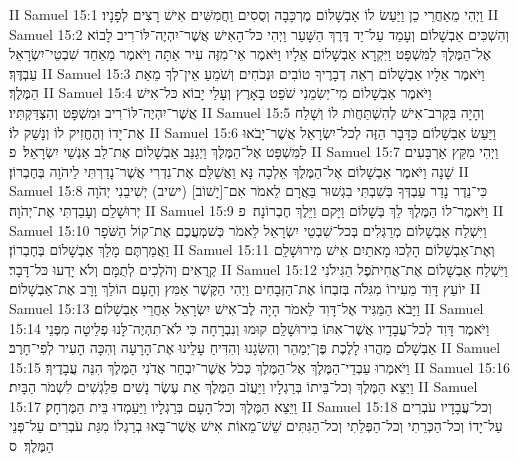II Samuel 15:1	וַיְהִי מֵאַחֲרֵי כֵן וַיַּעַשׂ לוֹ אַבְשָׁלוֹם מֶרְכָּבָה וְסֻסִים וַחֲמִשִּׁים אִישׁ רָצִים לְפָנָיו׃
II Samuel 15:2	וְהִשְׁכִּים אַבְשָׁלוֹם וְעָמַד עַל־יַד דֶּרֶךְ הַשָּׁעַר וַיְהִי כּל־הָאִישׁ אֲשֶׁר־יִהְיֶה־לּוֹ־רִיב לָבוֹא אֶל־הַמֶּלֶךְ לַמִּשְׁפָּט וַיִּקְרָא אַבְשָׁלוֹם אֵלָיו וַיֹּאמֶר אֵי־מִזֶּה עִיר אַתָּה וַיֹּאמֶר מֵאַחַד שִׁבְטֵי־יִשְׂרָאֵל עַבְדֶּךָ׃
II Samuel 15:3	וַיֹּאמֶר אֵלָיו אַבְשָׁלוֹם רְאֵה דְבָרֶיךָ טוֹבִים וּנְכֹחִים וְשֹׁמֵעַ אֵין־לְךָ מֵאֵת הַמֶּלֶךְ׃
II Samuel 15:4	וַיֹּאמֶר אַבְשָׁלוֹם מִי־יְשִׂמֵנִי שֹׁפֵט בָּאָרֶץ וְעָלַי יָבוֹא כּל־אִישׁ אֲשֶׁר־יִהְיֶה־לּוֹ־רִיב וּמִשְׁפָּט וְהִצְדַּקְתִּיו׃
II Samuel 15:5	וְהָיָה בִּקְרב־אִישׁ לְהִשְׁתַּחֲוֺת לוֹ וְשָׁלַח אֶת־יָדוֹ וְהֶחֱזִיק לוֹ וְנָשַׁק לוֹ׃
II Samuel 15:6	וַיַּעַשׂ אַבְשָׁלוֹם כַּדָּבָר הַזֶּה לְכל־יִשְׂרָאֵל אֲשֶׁר־יָבֹאוּ לַמִּשְׁפָּט אֶל־הַמֶּלֶךְ וַיְגַנֵּב אַבְשָׁלוֹם אֶת־לֵב אַנְשֵׁי יִשְׂרָאֵל׃ {פ}
II Samuel 15:7	וַיְהִי מִקֵּץ אַרְבָּעִים שָׁנָה וַיֹּאמֶר אַבְשָׁלוֹם אֶל־הַמֶּלֶךְ אֵלְכָה נָּא וַאֲשַׁלֵּם אֶת־נִדְרִי אֲשֶׁר־נָדַרְתִּי לַיהֹוָה בְּחֶבְרוֹן׃
II Samuel 15:8	כִּי־נֵדֶר נָדַר עַבְדְּךָ בְּשִׁבְתִּי בִגְשׁוּר בַּאֲרָם לֵאמֹר אִם־[יָשׁוֹב] (ישיב) יְשִׁיבֵנִי יְהֹוָה יְרוּשָׁלַ͏ִם וְעָבַדְתִּי אֶת־יְהֹוָה׃
II Samuel 15:9	וַיֹּאמֶר־לוֹ הַמֶּלֶךְ לֵךְ בְּשָׁלוֹם וַיָּקם וַיֵּלֶךְ חֶבְרוֹנָה׃ {פ}
II Samuel 15:10	וַיִּשְׁלַח אַבְשָׁלוֹם מְרַגְּלִים בְּכל־שִׁבְטֵי יִשְׂרָאֵל לֵאמֹר כְּשׁמְעֲכֶם אֶת־קוֹל הַשֹּׁפָר וַאֲמַרְתֶּם מָלַךְ אַבְשָׁלוֹם בְּחֶבְרוֹן׃
II Samuel 15:11	וְאֶת־אַבְשָׁלוֹם הָלְכוּ מָאתַיִם אִישׁ מִירוּשָׁלַ͏ִם קְרֻאִים וְהֹלְכִים לְתֻמָּם וְלֹא יָדְעוּ כּל־דָּבָר׃
II Samuel 15:12	וַיִּשְׁלַח אַבְשָׁלוֹם אֶת־אֲחִיתֹפֶל הַגִּילֹנִי יוֹעֵץ דָּוִד מֵעִירוֹ מִגִּלֹה בְּזבְחוֹ אֶת־הַזְּבָחִים וַיְהִי הַקֶּשֶׁר אַמִּץ וְהָעָם הוֹלֵךְ וָרָב אֶת־אַבְשָׁלוֹם׃
II Samuel 15:13	וַיָּבֹא הַמַּגִּיד אֶל־דָּוִד לֵאמֹר הָיָה לֶב־אִישׁ יִשְׂרָאֵל אַחֲרֵי אַבְשָׁלוֹם׃
II Samuel 15:14	וַיֹּאמֶר דָּוִד לְכל־עֲבָדָיו אֲשֶׁר־אִתּוֹ בִירוּשָׁלַ͏ִם קוּמוּ וְנִבְרָחָה כִּי לֹא־תִהְיֶה־לָּנוּ פְלֵיטָה מִפְּנֵי אַבְשָׁלֹם מַהֲרוּ לָלֶכֶת פֶּן־יְמַהֵר וְהִשִּׂגָנוּ וְהִדִּיחַ עָלֵינוּ אֶת־הָרָעָה וְהִכָּה הָעִיר לְפִי־חָרֶב׃
II Samuel 15:15	וַיֹּאמְרוּ עַבְדֵי־הַמֶּלֶךְ אֶל־הַמֶּלֶךְ כְּכֹל אֲשֶׁר־יִבְחַר אֲדֹנִי הַמֶּלֶךְ הִנֵּה עֲבָדֶיךָ׃
II Samuel 15:16	וַיֵּצֵא הַמֶּלֶךְ וְכל־בֵּיתוֹ בְּרַגְלָיו וַיַּעֲזֹב הַמֶּלֶךְ אֵת עֶשֶׂר נָשִׁים פִּלַגְשִׁים לִשְׁמֹר הַבָּיִת׃
II Samuel 15:17	וַיֵּצֵא הַמֶּלֶךְ וְכל־הָעָם בְּרַגְלָיו וַיַּעַמְדוּ בֵּית הַמֶּרְחָק׃
II Samuel 15:18	וְכל־עֲבָדָיו עֹבְרִים עַל־יָדוֹ וְכל־הַכְּרֵתִי וְכל־הַפְּלֵתִי וְכל־הַגִּתִּים שֵׁשׁ־מֵאוֹת אִישׁ אֲשֶׁר־בָּאוּ בְרַגְלוֹ מִגַּת עֹבְרִים עַל־פְּנֵי הַמֶּלֶךְ׃ {ס}        
